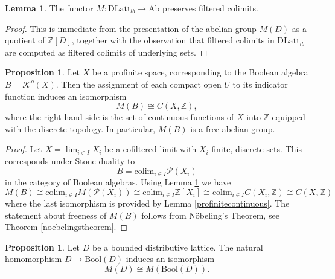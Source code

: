 \documentclass[10pt]{amsart}
\theoremstyle{definition}
\newtheorem{lemma}[theorem]{Lemma}
\newtheorem{proposition}[theorem]{Proposition}
\newcommand{\colim}{\text{colim}}
\begin{document}
\begin{lemma} \label{motivesfiltered}
The functor $M : \mathrm{DLatt}_{lb} \rightarrow \mathrm{Ab}$ preserves filtered colimits.
\end{lemma}

\begin{proof}
This is immediate from the presentation of the abelian group $M(D)$ as a quotient of $\mathbb{Z}[D]$, together with the observation that filtered colimits in $ \mathrm{DLatt}_{lb}$ are computed as filtered colimits of underlying sets.
\end{proof}



\begin{proposition} \label{motivesforboolean}
Let $X$ be a profinite space, corresponding to the Boolean algebra $B = \mathcal{K}^o(X)$. Then the assignment of each compact open $U$ to its indicator function induces an isomorphism
$$M(B) \cong C(X, \mathbb{Z}),$$
where the right hand side is the set of continuous functions of $X$ into $\mathbb{Z}$ equipped with the discrete topology. In particular, $M(B)$ is a free abelian group.
\end{proposition}

\begin{proof}
Let $X = \lim_{i \in I} X_i$ be a cofiltered limit with $X_i$ finite, discrete sets. This corresponds under Stone duality to
$$B = \colim_{i \in I} \mathcal{P}(X_i)$$
in the category of Boolean algebras. Using Lemma \ref{motivesfiltered} we have
$$M(B) \cong \colim_{i \in I} M(\mathcal{P}(X_i)) \cong \colim_{i \in I} \mathbb{Z}[X_i] \cong \colim_{i \in I} C(X_i, \mathbb{Z}) \cong C(X, \mathbb{Z})$$
where the last isomorphism is provided by Lemma \ref{profinitecontinuous}. The statement about freeness of $M(B)$ follows from Nöbeling’s Theorem, see Theorem \ref{noebelingstheorem}.
\end{proof}



\begin{proposition} \label{motivesonbooleanization}
Let $D$ be a bounded distributive lattice. The natural homomorphism
$D \rightarrow \mathrm{Bool}(D)$ induces an isomorphism
$$M(D) \cong M(\mathrm{Bool}(D)).$$
\end{proposition}
\end{document}
